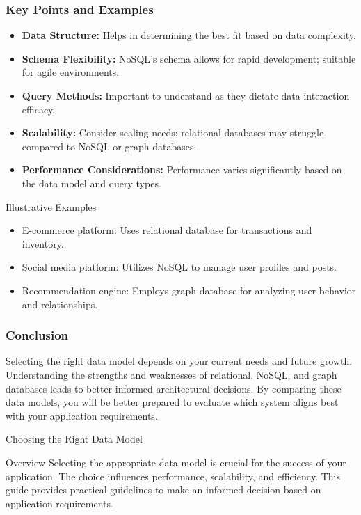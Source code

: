 \documentclass[aspectratio=169]{beamer}
\begin{document}
\begin{frame}[fragile]
    \frametitle{Key Points and Examples}
    \begin{itemize}
        \item \textbf{Data Structure:} Helps in determining the best fit based on data complexity.
        \item \textbf{Schema Flexibility:} NoSQL's schema allows for rapid development; suitable for agile environments.
        \item \textbf{Query Methods:} Important to understand as they dictate data interaction efficacy.
        \item \textbf{Scalability:} Consider scaling needs; relational databases may struggle compared to NoSQL or graph databases.
        \item \textbf{Performance Considerations:} Performance varies significantly based on the data model and query types.
    \end{itemize}
    
    \begin{block}{Illustrative Examples}
        \begin{itemize}
            \item E-commerce platform: Uses relational database for transactions and inventory.
            \item Social media platform: Utilizes NoSQL to manage user profiles and posts.
            \item Recommendation engine: Employs graph database for analyzing user behavior and relationships.
        \end{itemize}
    \end{block}
\end{frame}

\begin{frame}[fragile]
    \frametitle{Conclusion}
    Selecting the right data model depends on your current needs and future growth. 
    Understanding the strengths and weaknesses of relational, NoSQL, and graph databases leads to better-informed architectural decisions. 
    By comparing these data models, you will be better prepared to evaluate which system aligns best with your application requirements.
\end{frame}

\begin{frame}[fragile]{Choosing the Right Data Model}
    \begin{block}{Overview}
        Selecting the appropriate data model is crucial for the success of your application. The choice influences performance, scalability, and efficiency. This guide provides practical guidelines to make an informed decision based on application requirements.
    \end{block}
\end{frame}
\end{document}
